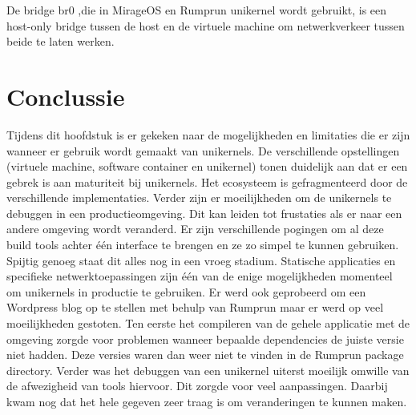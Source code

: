 De bridge br0 ,die in MirageOS en Rumprun unikernel wordt gebruikt, is een host-only bridge tussen de host en de virtuele machine om netwerkverkeer tussen beide te laten werken.

\section{Conclussie}

Tijdens dit hoofdstuk is er gekeken naar de mogelijkheden en limitaties die er zijn wanneer er gebruik wordt gemaakt van unikernels. De verschillende opstellingen (virtuele machine, software container en unikernel) tonen duidelijk aan dat er een gebrek is aan maturiteit bij unikernels. Het ecosysteem is gefragmenteerd door de verschillende implementaties. Verder zijn er moeilijkheden om de unikernels te debuggen in een productieomgeving. Dit kan leiden tot frustaties als er naar een andere omgeving wordt veranderd. Er zijn verschillende pogingen om al deze build tools achter één interface te brengen en ze zo simpel te kunnen gebruiken. Spijtig genoeg staat dit alles nog in een vroeg stadium. Statische applicaties en specifieke netwerktoepassingen zijn één van de enige mogelijkheden momenteel om unikernels in productie te gebruiken. Er werd ook geprobeerd om een Wordpress blog op te stellen met behulp van Rumprun maar er werd op veel moeilijkheden gestoten. Ten eerste het compileren van de gehele applicatie met de omgeving zorgde voor problemen wanneer bepaalde dependencies de juiste versie niet hadden. Deze versies waren dan weer niet te vinden in de Rumprun package directory. Verder was het debuggen van een unikernel uiterst moeilijk omwille van de afwezigheid van tools hiervoor. Dit zorgde voor veel aanpassingen. Daarbij kwam nog dat het hele gegeven zeer traag is om veranderingen te kunnen maken.
